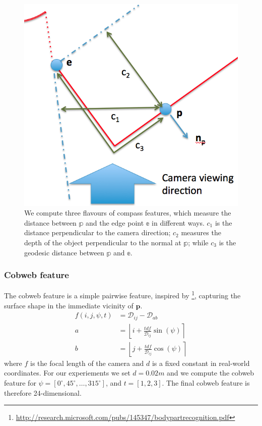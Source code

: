\documentclass[10pt,twocolumn,letterpaper]{article}
\newcommand{\point}{\mathbf{p}}
\newcommand{\degree}{^{\circ}}
\newcommand{\rgbdimage}{\mathcal{D}}
\begin{document}
\begin{figure}
    \centering 
    \includegraphics[width=1.0\columnwidth]{compass_features}
    \caption{We compute three flavours of compass features, which measure the distance between $\mathbb{p}$ and the edge point $\mathbb{e}$ in different ways. $c_1$ is the distance perpendicular to the camera direction; $c_2$ measures the depth of the object perpendicular to the normal at $\mathbb{p}$; while $c_3$ is the geodesic distance between $\mathbb{p}$ and $\mathbb{e}$.}
    \label{fig:compass_features}
\end{figure}


\subsubsection{Cobweb feature}
The cobweb feature is a simple pairwise feature, inspired by \footnote{\url{http://research.microsoft.com/pubs/145347/bodypartrecognition.pdf}}, capturing the surface shape in the immediate vicinity of $\point$.
\begin{align}
f(i, j, \psi, t) &= \rgbdimage_{ij} - \rgbdimage_{ab} \\
a &= \left\lfloor i + \frac{tdf}{\rgbdimage_{ij}}  \sin(\psi) \right\rceil \\
b &= \left\lfloor j + \frac{tdf}{\rgbdimage_{ij}}  \cos(\psi) \right\rceil
\end{align}
where $f$ is the focal length of the camera and $d$ is a fixed constant in real-world coordinates. For our experiements we set $d=0.02m$ and we compute the cobweb feature for $\psi = [0\degree, 45\degree, \ldots, 315\degree]$, and $t = [1, 2, 3]$. 
The final cobweb feature is therefore 24-dimensional.
\end{document}
